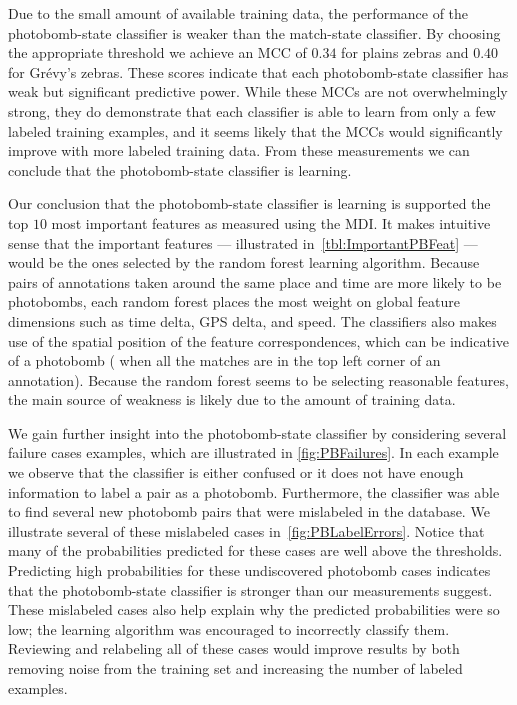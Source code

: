         Due to the small amount of available training data, the performance of the photobomb-state classifier is
          weaker than the match-state classifier.
        By choosing the appropriate threshold we achieve an MCC of $0.34$ for plains zebras and $0.40$ for
          Grévy's zebras.
        These scores indicate that each photobomb-state classifier has weak but significant predictive power.
        While these MCCs are not overwhelmingly strong, they do demonstrate that each classifier is able to learn
          from only a few labeled training examples, and it seems likely that the MCCs would significantly improve
          with more labeled training data.
        From these measurements we can conclude that the photobomb-state classifier is learning.

        \FloatBarrier{}

        Our conclusion that the photobomb-state classifier is learning is supported the top $10$ most important
          features as measured using the MDI.
        It makes intuitive sense that the important features --- illustrated in~\cref{tbl:ImportantPBFeat} ---
          would be the ones selected by the random forest learning algorithm.
        Because pairs of annotations taken around the same place and time are more likely to be photobombs, each
          random forest places the most weight on global feature dimensions such as time delta, GPS delta, and
          speed.
        The classifiers also makes use of the spatial position of the feature correspondences, which can be
          indicative of a photobomb (\eg{} when all the matches are in the top left corner of an annotation).
        Because the random forest seems to be selecting reasonable features, the main source of weakness is
          likely due to the amount of training data.

        \ImportantPBFeat{}

        We gain further insight into the photobomb-state classifier by considering several failure cases
          examples, which are illustrated in \cref{fig:PBFailures}.
        In each example we observe that the classifier is either confused or it does not have enough information
          to label a pair as a photobomb.
        Furthermore, the classifier was able to find several new photobomb pairs that were mislabeled in the
          database.
        We illustrate several of these mislabeled cases in~\cref{fig:PBLabelErrors}.
        Notice that many of the probabilities predicted for these cases are well above the thresholds.
        Predicting high probabilities for these undiscovered photobomb cases indicates that the photobomb-state
          classifier is stronger than our measurements suggest.
        These mislabeled \groundtruth{} cases also help explain why the predicted probabilities were so low; the
          learning algorithm was encouraged to incorrectly classify them.
        Reviewing and relabeling all of these cases would improve results by both removing noise from the
          training set and increasing the number of labeled examples.

